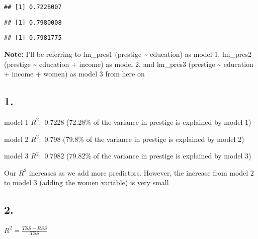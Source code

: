 \documentclass[
]{article}
\newenvironment{Shaded}{\begin{snugshade}}{\end{snugshade}}
\newcommand{\KeywordTok}[1]{\textcolor[rgb]{0.13,0.29,0.53}{\textbf{#1}}}
\newcommand{\NormalTok}[1]{#1}
\newcommand{\OperatorTok}[1]{\textcolor[rgb]{0.81,0.36,0.00}{\textbf{#1}}}
\begin{document}
\begin{verbatim}
## [1] 0.7228007
\end{verbatim}

\begin{Shaded}
\end{Shaded}

\begin{verbatim}
## [1] 0.7980008
\end{verbatim}

\begin{Shaded}
\end{Shaded}

\begin{verbatim}
## [1] 0.7981775
\end{verbatim}

\textbf{Note:} I'll be referring to lm\_pres1 (prestige
\textasciitilde{} education) as model 1, lm\_pres2 (prestige
\textasciitilde{} education + income) as model 2, and lm\_pres3
(prestige \textasciitilde{} education + income + women) as model 3 from
here on

\hypertarget{section-3}{%
\subsection{1.}\label{section-3}}

model 1 \(R^2:\) 0.7228 (72.28\% of the variance in prestige is
explained by model 1)

model 2 \(R^2:\) 0.798 (79.8\% of the variance in prestige is explained
by model 2)

model 3 \(R^2:\) 0.7982 (79.82\% of the variance in prestige is
explained by model 3)

Our \(R^2\) increases as we add more predictors. However, the increase
from model 2 to model 3 (adding the women variable) is very small

\hypertarget{section-4}{%
\subsection{2.}\label{section-4}}

\(R^2 = \frac{TSS - RSS}{TSS}\)
\end{document}
